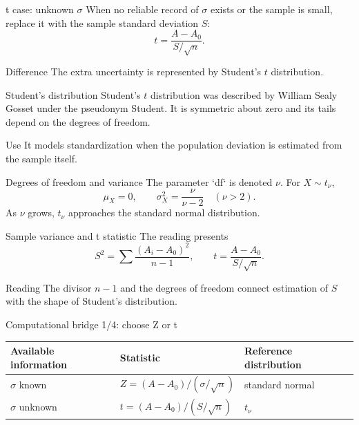 \documentclass[10pt,aspectratio=169]{beamer}
\begin{document}
\begin{frame}{t case: unknown $\sigma$}
  \footnotesize
  When no reliable record of $\sigma$ exists or the sample is small, replace it
  with the sample standard deviation $S$:
  \[
    t=\frac{A-A_0}{S/\sqrt n}.
  \]
  \begin{alertblock}{Difference}
    The extra uncertainty is represented by Student's $t$ distribution.
  \end{alertblock}
\end{frame}

\begin{frame}{Student's distribution}
  \footnotesize
  Student's $t$ distribution was described by William Sealy Gosset under the
  pseudonym Student. It is symmetric about zero and its tails depend on the
  degrees of freedom.
  \begin{block}{Use}
    It models standardization when the population deviation is estimated from
    the sample itself.
  \end{block}
\end{frame}

\begin{frame}{Degrees of freedom and variance}
  \footnotesize
  The parameter `df` is denoted $\nu$. For $X\sim t_\nu$,
  \[
    \mu_X=0,\qquad \sigma_X^2=\frac{\nu}{\nu-2}
    \quad(\nu>2).
  \]
  As $\nu$ grows, $t_\nu$ approaches the standard normal distribution.
\end{frame}

\begin{frame}{Sample variance and t statistic}
  \footnotesize
  The reading presents
  \[
    S^2=\sum\frac{(A_i-A_0)^2}{n-1},
    \qquad t=\frac{A-A_0}{S/\sqrt n}.
  \]
  \begin{alertblock}{Reading}
    The divisor $n-1$ and the degrees of freedom connect estimation of $S$ with
    the shape of Student's distribution.
  \end{alertblock}
\end{frame}

\begin{frame}{Computational bridge 1/4: choose Z or t}
  \footnotesize
  \begin{tabular}{lll}
    \hline
    Available information & Statistic & Reference distribution \\
    \hline
    $\sigma$ known & $Z=(A-A_0)/(\sigma/\sqrt n)$ & standard normal \\
    $\sigma$ unknown & $t=(A-A_0)/(S/\sqrt n)$ & $t_\nu$ \\
    \hline
  \end{tabular}
\end{frame}
\end{document}
